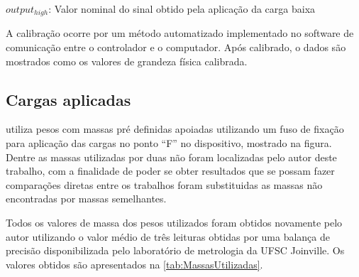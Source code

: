 $output_{high}$: Valor nominal do sinal obtido pela aplicação da carga baixa

\hfill

A calibração ocorre por um método automatizado implementado no software de comunicação entre o controlador e o computador.
Após calibrado, o dados são mostrados como os valores de grandeza física calibrada.

\subsection{Cargas aplicadas}

\autocite{Minela2017} utiliza pesos com massas pré definidas apoiadas utilizando um fuso de fixação para aplicação das cargas no ponto “F” no dispositivo, mostrado na figura.
Dentre as massas utilizadas por \autocite{Minela2017} duas não foram localizadas pelo autor deste trabalho, com a finalidade de poder se obter resultados que se possam fazer
comparações diretas entre os trabalhos foram substituidas as massas não encontradas por massas semelhantes.

Todos os valores de massa dos pesos utilizados foram obtidos novamente pelo autor utilizando o valor médio de três leituras obtidas por uma balança de precisão disponibilizada pelo laboratório de metrologia
da UFSC Joinville. Os valores obtidos são apresentados na \autoref{tab:MassasUtilizadas}.

\begin{table}[!ht]
    \caption{Valores de massas utilizadas para aplicação das cargas nos dispositivos de flexão e torção}
    \label{tab:MassasUtilizadas}
    \centering
\end{table}

